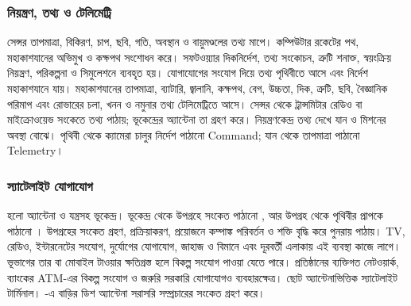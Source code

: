 \subsubsection{নিয়ন্ত্রণ, তথ্য ও টেলিমেট্রি}
সেন্সর তাপমাত্রা, বিকিরণ, চাপ, ছবি, গতি, অবস্থান ও বায়ুমণ্ডলের তথ্য মাপে। কম্পিউটার রকেটের পথ, মহাকাশযানের অভিমুখ ও কক্ষপথ সংশোধন করে। সফটওয়্যার দিকনির্দেশ, তথ্য সংকোচন, ত্রুটি শনাক্ত, স্বয়ংক্রিয় নিয়ন্ত্রণ, পরিকল্পনা ও সিমুলেশনে ব্যবহৃত হয়। যোগাযোগের সংযোগ দিয়ে তথ্য পৃথিবীতে আসে এবং নির্দেশ মহাকাশযানে যায়।
মহাকাশযানের তাপমাত্রা, ব্যাটারি, জ্বালানি, কক্ষপথ, বেগ, উচ্চতা, দিক, ত্রুটি, ছবি, বৈজ্ঞানিক পরিমাপ এবং রোভারের চলা, খনন ও নমুনার তথ্য টেলিমেট্রিতে আসে। সেন্সর থেকে ট্রান্সমিটার রেডিও বা মাইক্রোওয়েভ সংকেতে তথ্য পাঠায়; ভূকেন্দ্রের অ্যান্টেনা তা গ্রহণ করে। নিয়ন্ত্রণকেন্দ্র তথ্য দেখে যান ও মিশনের অবস্থা বোঝে। পৃথিবী থেকে ক্যামেরা চালুর নির্দেশ পাঠানো Command; যান থেকে তাপমাত্রা পাঠানো Telemetry।
\subsubsection{স্যাটেলাইট যোগাযোগ}
 হলো অ্যান্টেনা ও যন্ত্রসহ ভূকেন্দ্র। ভূকেন্দ্র থেকে উপগ্রহে সংকেত পাঠানো , আর উপগ্রহ থেকে পৃথিবীর প্রাপকে পাঠানো । উপগ্রহের  সংকেত গ্রহণ, প্রক্রিয়াকরণ, প্রয়োজনে কম্পাঙ্ক পরিবর্তন ও শক্তি বৃদ্ধি করে পুনরায় পাঠায়।
TV, রেডিও, ইন্টারনেটের সংযোগ, দুর্যোগের যোগাযোগ, জাহাজ ও বিমানে এবং দূরবর্তী এলাকায় এই ব্যবস্থা কাজে লাগে। ভূভাগের তার বা মোবাইল টাওয়ার ক্ষতিগ্রস্ত হলে বিকল্প সংযোগ পাওয়া যেতে পারে। প্রতিষ্ঠানের ব্যক্তিগত নেটওয়ার্ক, ব্যাংকের ATM-এর বিকল্প সংযোগ ও জরুরি সরকারি যোগাযোগও ব্যবহারক্ষেত্র।
 ছোট অ্যান্টেনাভিত্তিক স্যাটেলাইট টার্মিনাল। -এ বাড়ির ডিশ অ্যান্টেনা সরাসরি সম্প্রচারের সংকেত গ্রহণ করে।
